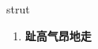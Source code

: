 
\begin{frame}
{\huge strut}
\begin{center}
\begin{enumerate}\Large
  \item \textbf{趾高气昂地走}
\end{enumerate}
\end{center}
\end{frame}
